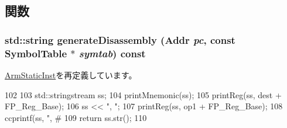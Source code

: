 \subsection{関数}
\hypertarget{classArmISA_1_1FpRegRegImmOp_a95d323a22a5f07e14d6b4c9385a91896}{
\subsubsection[{generateDisassembly}]{\setlength{\rightskip}{0pt plus 5cm}std::string generateDisassembly ({\bf Addr} {\em pc}, \/  const SymbolTable $\ast$ {\em symtab}) const}}
\label{classArmISA_1_1FpRegRegImmOp_a95d323a22a5f07e14d6b4c9385a91896}


\hyperlink{classArmISA_1_1ArmStaticInst_a95d323a22a5f07e14d6b4c9385a91896}{ArmStaticInst}を再定義しています。


\begin{DoxyCode}
102 {
103     std::stringstream ss;
104     printMnemonic(ss);
105     printReg(ss, dest + FP_Reg_Base);
106     ss << ", ";
107     printReg(ss, op1 + FP_Reg_Base);
108     ccprintf(ss, ", #%
109     return ss.str();
110 }
\end{DoxyCode}


